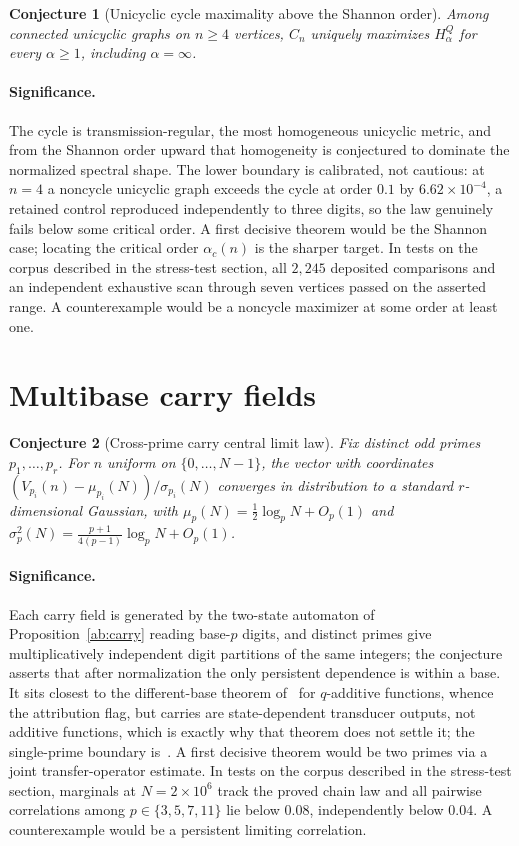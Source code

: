 \documentclass[11pt]{article}
\newtheorem{conjecture}{Conjecture}
\theoremstyle{definition}
\begin{document}
\begin{conjecture}[Unicyclic cycle maximality above the Shannon order]\label{ab11}
Among connected unicyclic graphs on $n\ge4$ vertices, $C_n$ uniquely maximizes $H^Q_\alpha$ for every $\alpha\ge1$, including $\alpha=\infty$.
\end{conjecture}

\paragraph{Significance.}
The cycle is transmission-regular, the most homogeneous unicyclic metric, and from the Shannon order upward that homogeneity is conjectured to dominate the normalized spectral shape.  The lower boundary is calibrated, not cautious: at $n=4$ a noncycle unicyclic graph exceeds the cycle at order $0.1$ by $6.62\times10^{-4}$, a retained control reproduced independently to three digits, so the law genuinely fails below some critical order.  A first decisive theorem would be the Shannon case; locating the critical order $\alpha_c(n)$ is the sharper target.  In tests on the corpus described in the stress-test section, all $2{,}245$ deposited comparisons and an independent exhaustive scan through seven vertices passed on the asserted range.  A counterexample would be a noncycle maximizer at some order at least one.

\section{Multibase carry fields}

\begin{conjecture}[Cross-prime carry central limit law]\label{ab12}
Fix distinct odd primes $p_1,\ldots,p_r$.  For $n$ uniform on $\{0,\ldots,N-1\}$, the vector with coordinates $(V_{p_i}(n)-\mu_{p_i}(N))/\sigma_{p_i}(N)$ converges in distribution to a standard $r$-dimensional Gaussian, with $\mu_p(N)=\tfrac12\log_pN+O_p(1)$ and $\sigma_p^2(N)=\tfrac{p+1}{4(p-1)}\log_pN+O_p(1)$.
\end{conjecture}

\paragraph{Significance.}
Each carry field is generated by the two-state automaton of Proposition~\ref{ab:carry} reading base-$p$ digits, and distinct primes give multiplicatively independent digit partitions of the same integers; the conjecture asserts that after normalization the only persistent dependence is within a base.  It sits closest to the different-base theorem of~\cite{Drm01} for $q$-additive functions, whence the attribution flag, but carries are state-dependent transducer outputs, not additive functions, which is exactly why that theorem does not settle it; the single-prime boundary is~\cite{Hol97}.  A first decisive theorem would be two primes via a joint transfer-operator estimate.  In tests on the corpus described in the stress-test section, marginals at $N=2\times10^6$ track the proved chain law and all pairwise correlations among $p\in\{3,5,7,11\}$ lie below $0.08$, independently below $0.04$.  A counterexample would be a persistent limiting correlation.
\end{document}
